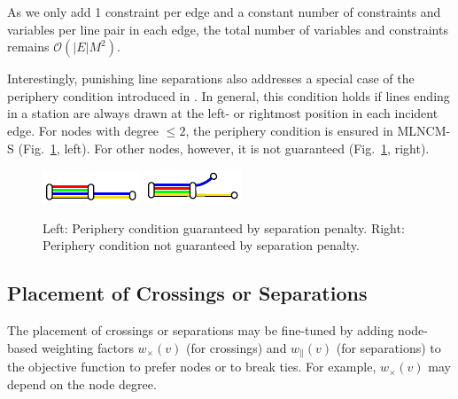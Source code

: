 \documentclass[sigconf]{acmart}
\begin{document}
As we only add 1 constraint per edge and a constant number of constraints and variables per line pair in each edge, the total number of variables and constraints remains $\mathcal{O}(|E|M^2)$.

Interestingly, punishing line separations also addresses a special case of the periphery condition introduced in \cite{asq08}. In general, this condition holds if lines ending in a station are always drawn at the left- or rightmost position in each incident edge. For nodes with degree $\leq 2$, the periphery condition is ensured in \mbox{MLNCM-S} (Fig.~\ref{FIG:periphery}, left). For other nodes, however, it is not guaranteed (Fig.~\ref{FIG:periphery}, right).

\begin{figure}[b]
\centering
\begin{minipage}{.48\textwidth}
  \centering
	\includegraphics[trim={0 1.22 0 1.8},clip,width=.49\textwidth]{render_examples/periphery/periphery_example1.pdf}
	\hfill
	\includegraphics[trim={0 1.75 0 1.8},clip,width=.49\textwidth]{render_examples/periphery/periphery_example2.pdf}
	\caption{Left: Periphery condition guaranteed by separation penalty. Right: Periphery condition not guaranteed by separation penalty.}
	\label{FIG:periphery}
\end{minipage}
\vspace{-.4em}
\end{figure}

\subsection{Placement of Crossings or Separations}\label{SEC:crossing_placement}
The placement of crossings or separations may be fine-tuned by adding node-based weighting factors $w_\times(v)$ (for crossings) and $w_\|(v)$ (for separations) to the objective function to prefer nodes or to break ties. For example, $w_\times(v)$ may depend on the node degree.
\end{document}
